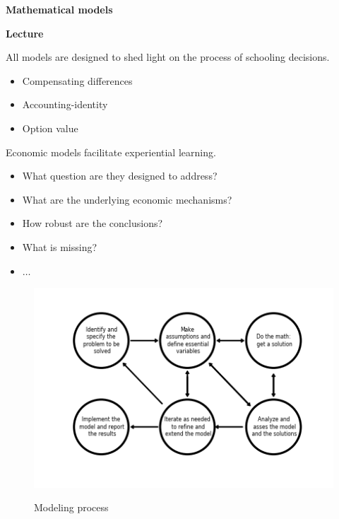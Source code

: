 \begin{frame}\begin{center}
		\LARGE\textbf{Mathematical models}
\end{center}\end{frame}
\begin{frame}\textbf{Lecture}\vspace{0.3cm}

All models are designed to shed light on the process of schooling decisions.\\\vspace{0.3cm}

\begin{itemize}\setlength\itemsep{1em}
\item Compensating differences
\item Accounting-identity
\item Option value
\end{itemize}

\end{frame}
\begin{frame}
Economic models facilitate experiential learning.\vspace{0.3cm}
\begin{itemize}\setlength\itemsep{1em}
\item What question are they designed to address?
\item What are the underlying economic mechanisms?
\item How robust are the conclusions?
\item What is missing?
\item $\hdots$
\end{itemize}

\end{frame}
\begin{frame}
	\begin{figure}[htp]\centering
		\caption{Modeling process}\scalebox{0.45}
		{\includegraphics{../01_introduction/material/fig-modeling-process}}
	\end{figure}
\end{frame}
